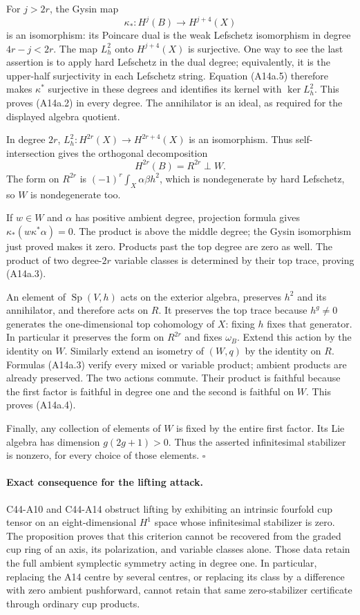\documentclass[11pt]{article}
\theoremstyle{remark}\newtheorem{remark}[theorem]{Remark}
\begin{document}
For $j>2r$, the Gysin map
\[
                    \kappa_*:H^j(B)\longrightarrow H^{j+4}(X)
\]
is an isomorphism: its Poincare dual is the weak Lefschetz
isomorphism in degree $4r-j<2r$. The map $L_h^2$ onto
$H^{j+4}(X)$ is surjective. One way to see the last assertion
is to apply hard Lefschetz in the dual degree; equivalently,
it is the upper-half surjectivity in each Lefschetz string.
Equation (A14a.5) therefore makes $\kappa^*$ surjective in
these degrees and identifies its kernel with
$\ker L_h^2$. This proves (A14a.2) in every degree. The
annihilator is an ideal, as required for the displayed algebra
quotient.

In degree $2r$, $L_h^2:H^{2r}(X)\to H^{2r+4}(X)$ is an
isomorphism. Thus self-intersection gives the orthogonal
decomposition
\[
                        H^{2r}(B)=R^{2r}\perp W.
                                                               \tag{A14a.6}
\]
The form on $R^{2r}$ is
$(-1)^r\int_X\alpha\beta h^2$, which is nondegenerate by
hard Lefschetz, so $W$ is nondegenerate too.

If $w\in W$ and $\alpha$ has positive ambient degree,
projection formula gives $\kappa_*(w\kappa^*\alpha)=0$.
The product is above the middle degree; the Gysin isomorphism
just proved makes it zero. Products past the top degree are
zero as well. The product of two degree-$2r$ variable classes
is determined by their top trace, proving (A14a.3).

An element of $\operatorname{Sp}(V,h)$ acts on the exterior
algebra, preserves $h^2$ and its annihilator, and therefore
acts on $R$. It preserves the top trace because
$h^g\ne0$ generates the one-dimensional top cohomology of $X$:
fixing $h$ fixes that generator. In particular it preserves
the form on $R^{2r}$ and fixes $\omega_B$.
Extend this action by the identity on $W$.
Similarly extend an isometry of $(W,q)$ by the identity on
$R$. Formulas (A14a.3) verify every mixed or variable product;
ambient products are already preserved. The two actions commute.
Their product is faithful because the first factor is
faithful in degree one and the second is faithful on $W$.
This proves (A14a.4).

Finally, any collection of elements of $W$ is fixed by the
entire first factor. Its Lie algebra has dimension
$g(2g+1)>0$. Thus the asserted infinitesimal stabilizer is
nonzero, for every choice of those elements.
\hfill$\square$

\paragraph{Exact consequence for the lifting attack.}
C44-A10 and C44-A14 obstruct lifting by exhibiting an
intrinsic fourfold cup tensor on an eight-dimensional
$H^1$ space whose infinitesimal stabilizer is zero.
The proposition proves that this criterion cannot be
recovered from the graded cup ring of an axis, its
polarization, and variable classes alone. Those data retain
the full ambient symplectic symmetry acting in degree one.
In particular, replacing the A14 centre by several centres,
or replacing its class by a difference with zero ambient
pushforward, cannot retain that same zero-stabilizer
certificate through ordinary cup products.
\end{document}
